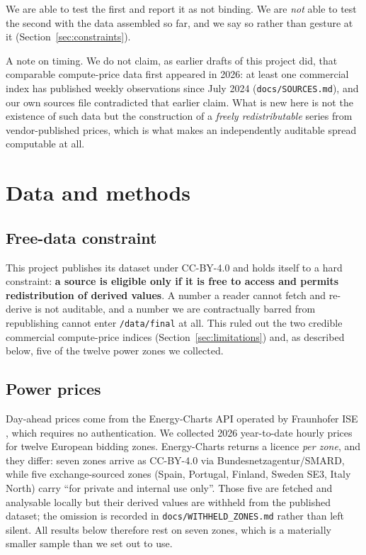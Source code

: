 \documentclass[11pt]{article}
\begin{document}
We are able to test the first and report it as not binding. We are
\emph{not} able to test the second with the data assembled so far, and we
say so rather than gesture at it (Section~\ref{sec:constraints}).

A note on timing. We do not claim, as earlier drafts of this project did,
that comparable compute-price data first appeared in 2026: at least one
commercial index has published weekly observations since July 2024
(\texttt{docs/SOURCES.md}), and our own sources file contradicted that
earlier claim. What is new here is not the existence of such data but the
construction of a \emph{freely redistributable} series from
vendor-published prices, which is what makes an independently auditable
spread computable at all.

\section{Data and methods}
\label{sec:data}

\subsection{Free-data constraint}

This project publishes its dataset under CC-BY-4.0 and holds itself to a
hard constraint: \textbf{a source is eligible only if it is free to access
and permits redistribution of derived values}. A number a reader cannot
fetch and re-derive is not auditable, and a number we are contractually
barred from republishing cannot enter \texttt{/data/final} at all. This
ruled out the two credible commercial compute-price indices
(Section~\ref{sec:limitations}) and, as described below, five of the twelve
power zones we collected.

\subsection{Power prices}

Day-ahead prices come from the Energy-Charts API operated by Fraunhofer ISE
\citep{energy-charts}, which requires no authentication. We collected 2026
year-to-date hourly prices for twelve European bidding zones. Energy-Charts
returns a licence \emph{per zone}, and they differ: seven zones arrive as
CC-BY-4.0 via Bundesnetzagentur/SMARD, while five exchange-sourced zones
(Spain, Portugal, Finland, Sweden SE3, Italy North) carry ``for private and
internal use only''. Those five are fetched and analysable locally but
their derived values are withheld from the published dataset; the omission
is recorded in \texttt{docs/WITHHELD\_ZONES.md} rather than left silent.
All results below therefore rest on seven zones, which is a materially
smaller sample than we set out to use.
\end{document}

